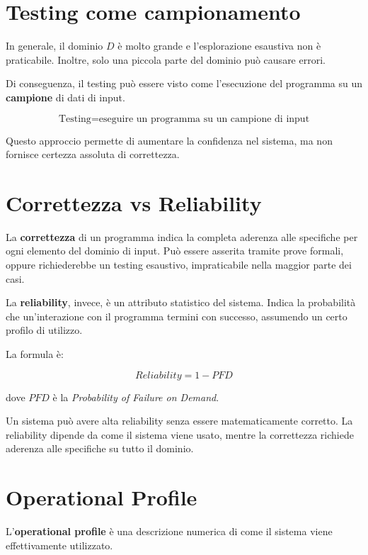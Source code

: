 \section{Testing come campionamento}

In generale, il dominio \(D\) è molto grande e l'esplorazione esaustiva non è praticabile. Inoltre, solo una piccola parte del dominio può causare errori.

Di conseguenza, il testing può essere visto come l'esecuzione del programma su un \textbf{campione} di dati di input.

\[
\text{Testing} = \text{eseguire un programma su un campione di input}
\]

Questo approccio permette di aumentare la confidenza nel sistema, ma non fornisce certezza assoluta di correttezza.

\section{Correttezza vs Reliability}

La \textbf{correttezza} di un programma indica la completa aderenza alle specifiche per ogni elemento del dominio di input. Può essere asserita tramite prove formali, oppure richiederebbe un testing esaustivo, impraticabile nella maggior parte dei casi.

La \textbf{reliability}, invece, è un attributo statistico del sistema. Indica la probabilità che un'interazione con il programma termini con successo, assumendo un certo profilo di utilizzo.

La formula è:

\[
Reliability = 1 - PFD
\]

dove \(PFD\) è la \emph{Probability of Failure on Demand}.

\begin{notaesame}
Un sistema può avere alta reliability senza essere matematicamente corretto. La reliability dipende da come il sistema viene usato, mentre la correttezza richiede aderenza alle specifiche su tutto il dominio.
\end{notaesame}

\section{Operational Profile}

L'\textbf{operational profile} è una descrizione numerica di come il sistema viene effettivamente utilizzato.

